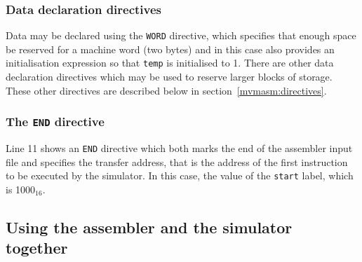 \subsubsection{Data declaration directives}

Data may be declared using the {\tt WORD} directive, which specifies
that enough space be reserved for a machine word (two bytes) and in this
case also provides an initialisation expression so that {\tt temp} is
initialised to 1.  There are other data declaration directives which may
be used to reserve  larger blocks of storage. These other directives are
described below in section~\ref{mvmasm:directives}.

\subsubsection{The {\tt END} directive}
Line 11 shows an {\tt END} directive which both marks the end of the
assembler input file and specifies the transfer address, that is the
address of the first instruction to be executed by the simulator. In
this case, the value of the {\tt start} label, which is 1000$_{16}$.

\subsection{Using the assembler and the simulator together}

